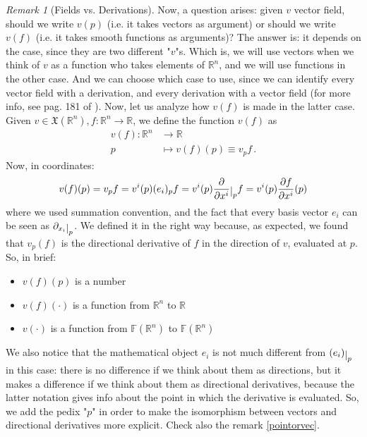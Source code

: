 \documentclass[a4paper,11pt,titlepage, article, oneside]{memoir}
\numberwithin{equation}{section}
\theoremstyle{definition}
\theoremstyle{remark}
\newtheorem{remark}[theorem]{Remark}
\newcommand{\rfield}{\mathbb{R}}
\newcommand{\restrict}[2]{{#1}\raisebox{-.5ex}{$|$}_{#2}}
\begin{document}
\begin{remarkbox}
\begin{remark} [Fields vs. Derivations]
  Now, a question arises: given $v$ vector field, should we write $v(p)$ (i.e. it takes vectors as argument) or should we write $v(f)$ (i.e. it takes smooth functions as arguments)? The answer is: it depends on the case, since they are two different "$v$"s. Which is, we will use vectors when we think of $v$ as a function who takes elements of $\rfield^n$, and we will use functions in the other case. And we can choose which case to use, since we can identify every vector field with a derivation, and every derivation with a vector field (for more info, see pag. 181 of ). Now, let us analyze how $v(f)$ is made in the latter case.
  Given $v \in \mathfrak{X}(\rfield^n), f: \rfield^n \rightarrow \rfield$, we define the function $v(f)$ as
  \begin{align} \label{vfpdef}
    v(f) \colon \rfield^n &\rightarrow \rfield \nonumber \\
    p & \mapsto v(f)(p) \equiv v_p f \, .
  \end{align}
  Now, in coordinates:
  \begin{equation} \label{vfieldincoord}
    v(f)(p) = v_p f = v^i(p)(e_i)_p f = v^i(p) \restrict{\frac{\partial}{\partial x^i}}{p} f = v^i(p) \frac{\partial f}{\partial x^i} (p)
  \end{equation}
  where we used summation convention, and the fact that every basis vector $e_i$ can be seen as $\restrict{\partial_{x_i}}{p}$. We defined it in the right way because, as expected, we found that $v_p(f)$ is the directional derivative of $f$ in the direction of $v$, evaluated at $p$. So, in brief:
  \begin{itemize}
    \item $v(f)(p)$ is a number
    \item $v(f)(\cdot)$ is a function from $\rfield^n$ to $\rfield$
    \item $v(\cdot)$ is a function from $\mathbb{F}(\rfield^n)$ to $\mathbb{F}(\rfield^n)$
  \end{itemize}
We also notice that the mathematical object $e_i$ is not much different from $\restrict{(e_i)}{p}$ in this case: there is no difference if we think about them as directions, but it makes a difference if we think about them as directional derivatives, because the latter notation gives info about the point in which the derivative is evaluated. So, we add the pedix "$p$" in order to make the isomorphism between vectors and directional derivatives more explicit. Check also the remark \ref{pointorvec}.
\end{remark}\end{remarkbox}
\end{document}
